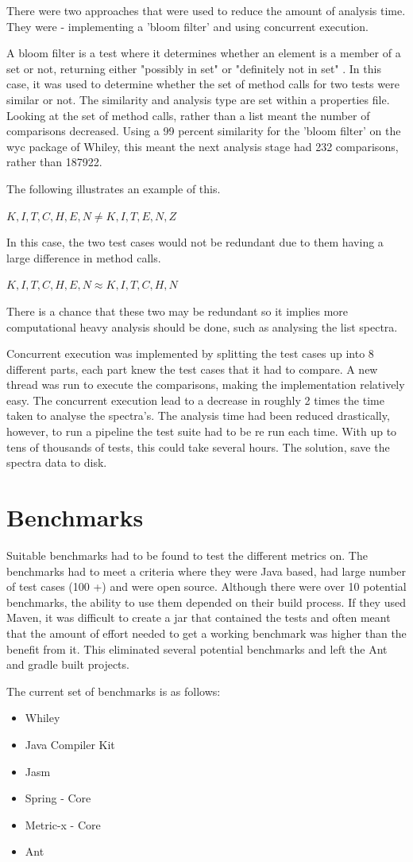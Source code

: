 There were two approaches that were used to reduce the amount of analysis time. They were - implementing a 'bloom filter' and using concurrent execution. 

A bloom filter is a test where it determines whether an element is a member of a set or not, returning either "possibly in set" or "definitely not in set" \cite{bloomfilterwiki}. In this case, it was used to determine whether the set of method calls for two tests were similar or not. The similarity and analysis type are set within a properties file. Looking at the set of method calls, rather than a list meant the number of comparisons decreased. Using a 99 percent similarity for the 'bloom filter' on the wyc package of Whiley, this meant the next analysis stage had 232 comparisons, rather than 187922. 

The following illustrates an example of this.

$K,I,T,C,H,E,N \neq K,I,T,E,N,Z $

In this case, the two test cases would not be redundant due to them having a large difference in method calls.

$K,I,T,C,H,E,N \approx K,I,T,C,H,N$

There is a chance that these two may be redundant so it implies more computational heavy analysis should be done, such as analysing the list spectra. 

Concurrent execution was implemented by splitting the test cases up into 8 different parts, each part knew the test cases that it had to compare. A new thread was run to execute the comparisons, making the implementation relatively easy. The concurrent execution lead to a decrease in roughly 2 times the time taken to analyse the spectra's. 
The analysis time had been reduced drastically, however, to run a pipeline the test suite had to be re run each time. With up to tens of thousands of tests, this could take several hours. The solution, save the spectra data to disk.

\section{Benchmarks}
\label{S:bench}
Suitable benchmarks had to be found to test the different metrics on. The benchmarks had to meet a criteria where they were Java based, had large number of test cases (100 +) and were open source. Although there were over 10 potential benchmarks, the ability to use them depended on their build process. If they used Maven, it was difficult to create a jar that contained the tests and often meant that the amount of effort needed to get a working benchmark was higher than the benefit from it. This eliminated several potential benchmarks and left the Ant and gradle built projects. 

The current set of benchmarks is as follows:

\begin{itemize}
\item Whiley
\item Java Compiler Kit
\item Jasm
\item Spring - Core
\item Metric-x - Core
\item Ant
\end{itemize}